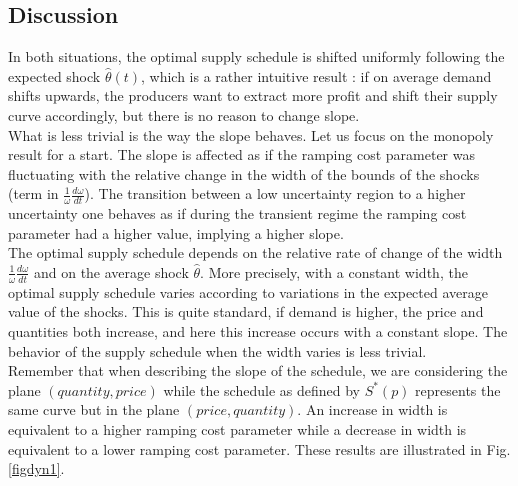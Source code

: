 \subsection{Discussion}

In both situations, the optimal supply schedule is shifted uniformly following the expected shock $\hat{\theta}(t)$, which is a rather intuitive result : if on average demand shifts upwards, the producers want to extract more profit and shift their supply curve accordingly, but there is no reason to change slope.\\

What is less trivial is the way the slope behaves. Let us focus on the monopoly result for a start. The slope is affected as if the ramping cost parameter was fluctuating with the relative change in the width of the bounds of the shocks (term in $\frac{1}{\omega}\frac{d\omega}{dt} $). The transition between a low uncertainty region to a higher uncertainty one behaves as if during the transient regime the ramping cost parameter had a higher value, implying a higher slope. \\
         
The optimal supply schedule depends on the relative rate of change of the width $\frac{1}{\omega}\frac{d\omega}{dt}$ and on the average shock $\hat{\theta}$. More precisely, with a constant width, the optimal supply schedule varies according to variations in the expected average value of the shocks. This is quite standard, if demand is higher, the price and quantities both increase, and here this increase occurs with a constant slope. The behavior of the supply schedule when the width varies is less trivial. \\

Remember that when describing the slope of the schedule, we are considering the plane $(quantity, price)$ while the schedule as defined by $S^*(p)$ represents the same curve but in the plane $(price, quantity)$. An increase in width is equivalent to a higher ramping cost parameter while a decrease in width is equivalent to a lower ramping cost parameter. These results are illustrated in Fig. \ref{figdyn1}. \\

